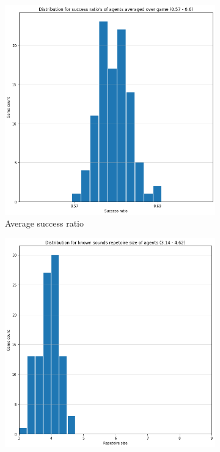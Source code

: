 \begin{figure}[ht]
    \centering
    \begin{subfigure}{.30\textwidth}
        \centering
        \includegraphics[width=\textwidth]{images/results/all_success.png}
        \captionsetup{width=0.9\linewidth}
        \captionsetup{justification=centering}
        \caption{Average success ratio}
    \end{subfigure}
    \hspace{0.5cm}
    \begin{subfigure}{.30\textwidth}
        \centering
        \includegraphics[width=\textwidth]{images/results/all_size.png}

\end{subfigure}
\end{figure}
